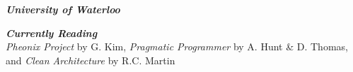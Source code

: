 \documentclass[9pt]{extarticle}
\begin{document}
{    \textit{\textbf{{\firamedium University of Waterloo}}}{\\[-20pt]}
    
    \textit{\textbf{{\firamedium Currently Reading}}}{\color{darkgrey}\\[0pt]
    {\textit{Pheonix Project}} by G. Kim, {\textit{Pragmatic Programmer}} by A. Hunt \& D. Thomas, and {\textit{Clean Architecture}} by R.C. Martin}
}
\end{document}
